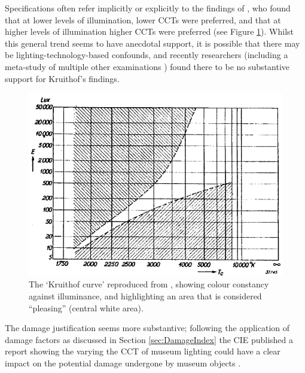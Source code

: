 Specifications often refer implicitly or explicitly to the findings of \citet{kruithof_tubular_1941}, who found that at lower levels of illumination, lower \glspl{CCT} were preferred, and that at higher levels of illumination higher \glspl{CCT} were preferred (see Figure \ref{fig:Kruithof}). Whilst this general trend seems to have anecdotal support, it is possible that there may be lighting-technology-based confounds, and recently researchers \citep{vienot_kruithofs_2009} (including a meta-study of multiple other examinations \citep{fotios_revised_2017}) found there to be no substantive support for Kruithof's findings.

\begin{figure}[htbp]
\includegraphics[max width=\textwidth]{figs/LitRev/Kruithof.png}
\caption{The `Kruithof curve' reproduced from \citet{kruithof_tubular_1941}, showing colour constancy against illuminance, and highlighting an area that is considered ``pleasing'' (central white area).}
\label{fig:Kruithof}
\end{figure}

The damage justification seems more substantive; following the application of damage factors as discussed in Section \ref{sec:DamageIndex} the \gls{CIE} published a report showing the varying the \gls{CCT} of museum lighting could have a clear impact on the potential damage undergone by museum objects \citep{cie_cie_2004}. 

